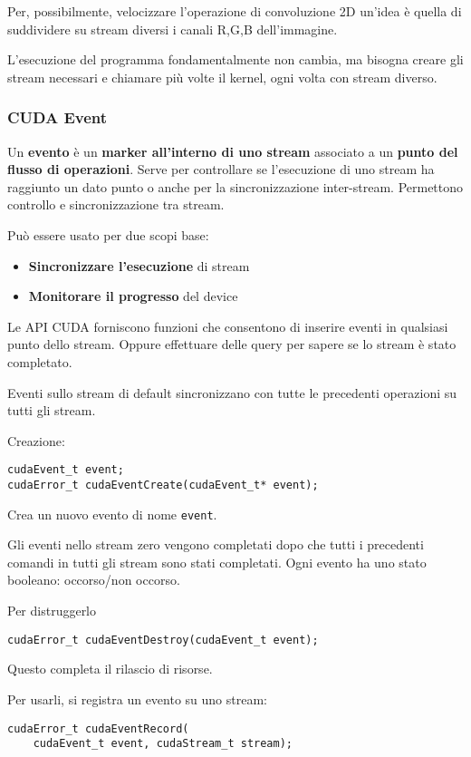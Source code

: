 Per, possibilmente, velocizzare l'operazione di convoluzione 2D un'idea è quella di suddividere su stream diversi i canali R,G,B dell'immagine. 

L'esecuzione del programma fondamentalmente non cambia, ma bisogna creare gli stream necessari e chiamare più volte il kernel, ogni volta con stream diverso.

\subsubsection{CUDA Event}

Un \textbf{evento} è un \textbf{marker all'interno di uno stream} associato a un \textbf{punto del flusso di operazioni}. Serve per controllare se l'esecuzione di uno stream ha raggiunto un dato punto o anche per la sincronizzazione inter-stream. Permettono controllo e sincronizzazione tra stream.

Può essere usato per due scopi base:
\begin{itemize}
	\item \textbf{Sincronizzare l'esecuzione} di stream
	
	\item \textbf{Monitorare il progresso} del device
\end{itemize}

Le API CUDA forniscono funzioni che consentono di inserire eventi in qualsiasi punto dello stream. Oppure effettuare delle query per sapere se lo stream è stato completato. 

Eventi sullo stream di default sincronizzano con tutte le precedenti operazioni su tutti gli stream.

Creazione:
\begin{verbatim}
cudaEvent_t event;
cudaError_t cudaEventCreate(cudaEvent_t* event);
\end{verbatim}
Crea un nuovo evento di nome \texttt{event}.

Gli eventi nello stream zero vengono completati dopo che tutti i precedenti comandi in tutti gli stream sono stati completati. Ogni evento ha uno stato booleano: occorso/non occorso.

Per distruggerlo
\begin{verbatim}
cudaError_t cudaEventDestroy(cudaEvent_t event);
\end{verbatim}

Questo completa il rilascio di risorse.

Per usarli, si registra un evento su uno stream:
\begin{verbatim}
cudaError_t cudaEventRecord(
    cudaEvent_t event, cudaStream_t stream);
\end{verbatim}

